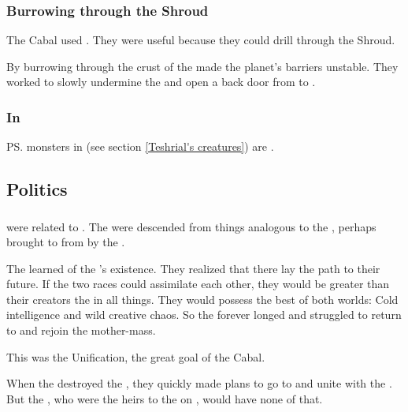 \subsubsection{Burrowing through the Shroud}
The Cabal used \noggyaleth.
They were useful because they could drill through the Shroud. 

By burrowing through the crust of \Miith the \noggyaleth made the planet's barriers unstable. 
They worked to slowly undermine the \CrystalSphere and open a back door from \Miith to \Erebos.





\subsubsection{In \Malcur}
\ps{\Teshrial} monsters in \Malcur (see section \ref{Teshrial's creatures}) are \noggyaleth. 









\subsection{Politics}





\subsubsection{\Banes}
\Banes were related to \noggyaleth.
The \banes were descended from things analogous to the \noggyal {}, perhaps brought to \Erebos from \Miith by the \voyagers.

The \banekings learned of the \noggyaleth's existence.
They realized that there lay the path to their future.
If the two races could assimilate each other, they would be greater than their creators the \voyagers in all things.
They would possess the best of both worlds: 
Cold intelligence and wild creative chaos.
So the \banes forever longed and struggled to return to \Miith and rejoin the mother-mass. 

This was the Unification, the great goal of the Cabal. 

When the \banes destroyed the \voyagers, they quickly made plans to go to \Miith and unite with the \noggyaleth.
But the \ophidians, who were the heirs to the \voyagers on \Miith, would have none of that.

